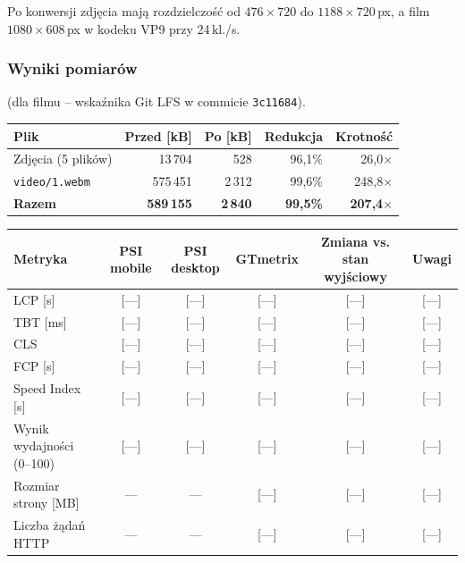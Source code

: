Po konwersji zdjęcia mają rozdzielczość od $476\times720$ do $1188\times720$\,px,
a film $1080\times608$\,px w kodeku VP9 przy 24\,kl./s.

\subsubsection{Wyniki pomiarów}

(dla filmu -- wskaźnika Git LFS w commicie \texttt{3c11684}).

\begin{tablehere}
\centering
\begin{tabular}{l r r r r}
\toprule
\textbf{Plik} & \textbf{Przed [kB]} & \textbf{Po [kB]} & \textbf{Redukcja} & \textbf{Krotność} \\
\midrule
Zdjęcia (5 plików) & 13\,704 & 528 & 96,1\% & 26,0$\times$ \\
\texttt{video/1.webm} & 575\,451 & 2\,312 & 99,6\% & 248,8$\times$ \\
\midrule
\textbf{Razem} & \textbf{589\,155} & \textbf{2\,840} & \textbf{99,5\%} & \textbf{207,4$\times$} \\
\bottomrule
\end{tabular}
\caption{Rozmiary mediów przed i po optymalizacji (1\,kB = 1000\,B)}
\end{tablehere}

\begin{tablehere}
\centering
\begin{tabular}{l c c c c c}
\toprule
\textbf{Metryka} & \textbf{PSI mobile} & \textbf{PSI desktop} & \textbf{GTmetrix} & \textbf{Zmiana vs. stan wyjściowy} & \textbf{Uwagi} \\
\midrule
LCP [s]        & [—] & [—] & [—] & [—] & [—] \\
TBT [ms]       & [—] & [—] & [—] & [—] & [—] \\
CLS            & [—] & [—] & [—] & [—] & [—] \\
FCP [s]        & [—] & [—] & [—] & [—] & [—] \\
Speed Index [s]& [—] & [—] & [—] & [—] & [—] \\
\midrule
Wynik wydajności (0–100) & [—] & [—] & [—] & [—] & [—] \\
Rozmiar strony [MB]      & —   & —   & [—] & [—] & [—] \\
Liczba żądań HTTP        & —   & —   & [—] & [—] & [—] \\
\bottomrule
\end{tabular}
\caption{Wyniki pomiarów dla optymalizacji mediów}
\end{tablehere}

